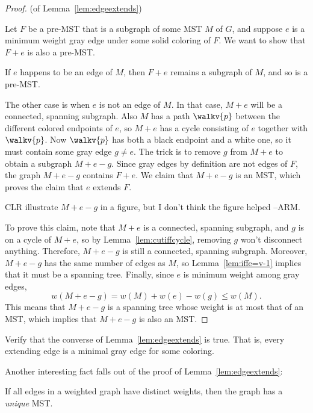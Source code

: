 \begin{proof} (of Lemma~\ref{lem:edgeextends})

  Let $F$ be a pre-MST that is a subgraph of some MST $M$ of $G$, and
  suppose $e$ is a minimum weight gray edge under some solid coloring of
  $F$.  We want to show that $F+e$ is also a pre-MST.

  If $e$ happens to be an edge of $M$, then $F+e$ remains a subgraph of
  $M$, and so is a pre-MST.

  The other case is when $e$ is not an edge of $M$.  In that case,
  $M+e$ will be a connected, spanning subgraph.  Also $M$ has a path
  $\walkv{p}$ between the different colored endpoints of $e$, so $M+e$
  has a cycle consisting of $e$ together with $\walkv{p}$.  Now
  $\walkv{p}$ has both a black endpoint and a white one, so it must
  contain some gray edge $g \neq e$.  The trick is to remove $g$ from
  $M+e$ to obtain a subgraph $M+e-g$.  Since gray edges by definition
  are not edges of $F$, the graph $M+e-g$ contains $F+e$.  We claim
  that $M+e-g$ is an MST, which proves the claim that $e$ extends $F$.

\begin{editingnotes}
  CLR illustrate $M+e-g$ in a figure, but I don't think the figure helped
  --ARM.
\end{editingnotes}

   To prove this claim, note that $M+e$ is a connected, spanning
   subgraph, and $g$ is on a cycle of $M+e$, so by
   Lemma~\ref{lem:cutiffcycle}, removing $g$ won't disconnect
   anything.  Therefore, $M+e-g$ is still a connected, spanning
   subgraph.  Moreover, $M+e-g$ has the same number of edges as $M$,
   so Lemma~\ref{lem:iffe=v-1} implies that it must be a spanning
   tree.  Finally, since $e$ is minimum weight among gray
   edges,\iffalse $w(e) \leq w(g)$, and therefore\fi
   \[
   w(M+e-g) = w(M) + w(e) - w(g) \leq w(M).
   \]
   This means that $M+e-g$ is a spanning tree whose weight is at most
   that of an MST, which implies that $M+e-g$ is also an MST.
\end{proof}

\begin{editingnotes}
  Verify that the converse of Lemma~\ref{lem:edgeextends} is true.
  That is, every extending edge is a minimal gray edge for some
  coloring.
\end{editingnotes}

Another interesting fact falls out of the proof of Lemma~\ref{lem:edgeextends}:
\begin{corollary}\label{cor:uniqMST}
If all edges in a weighted graph have distinct weights, then the graph has
a \emph{unique} MST.
\end{corollary}

